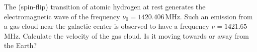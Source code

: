 The (spin-flip) transition of atomic hydrogen at rest generates the
electromagnetic wave of the frequency $\nu_0 = 1420.406$\,MHz. Such an
emission from a gas cloud near the galactic center is observed to have a
frequency $\nu = 1421.65$\,MHz. Calculate the velocity of the gas cloud. Is
it moving towards or away from the Earth?
